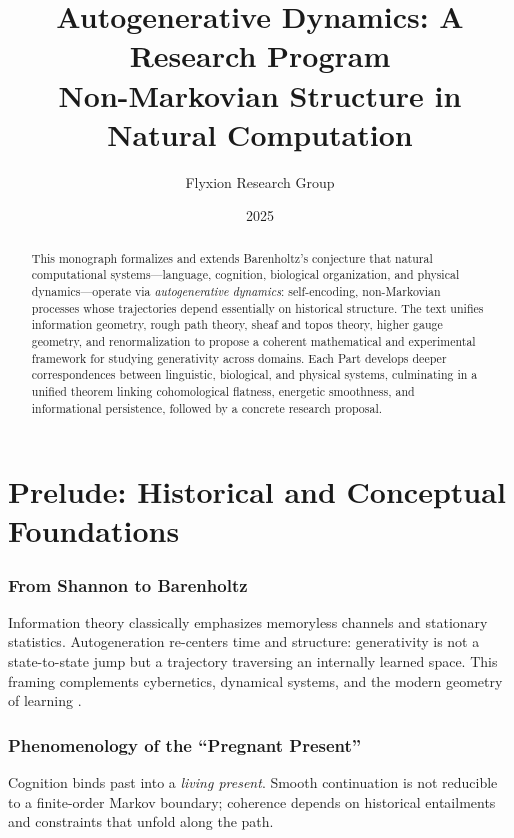 \documentclass[12pt,a4paper]{article}
\title{\Huge\textbf{Autogenerative Dynamics: A Research Program}\\[0.4em]
\large Non-Markovian Structure in Natural Computation}
\author{Flyxion Research Group}
\date{2025}
\theoremstyle{definition}
\begin{document}
\maketitle
\thispagestyle{empty}

\vspace{1em}
\begin{abstract}
This monograph formalizes and extends Barenholtz's conjecture that natural computational systems—language, cognition, biological organization, and physical dynamics—operate via \emph{autogenerative dynamics}: self-encoding, non-Markovian processes whose trajectories depend essentially on historical structure. The text unifies information geometry, rough path theory, sheaf and topos theory, higher gauge geometry, and renormalization to propose a coherent mathematical and experimental framework for studying generativity across domains. Each Part develops deeper correspondences between linguistic, biological, and physical systems, culminating in a unified theorem linking cohomological flatness, energetic smoothness, and informational persistence, followed by a concrete research proposal.
\end{abstract}

\newpage
\tableofcontents
\newpage

\part*{Prelude: Historical and Conceptual Foundations}

\section{From Shannon to Barenholtz}
Information theory classically emphasizes memoryless channels and stationary statistics. Autogeneration re-centers time and structure: generativity is not a state-to-state jump but a trajectory traversing an internally learned space. This framing complements cybernetics, dynamical systems, and the modern geometry of learning \parencite{amari2016info}.

\section{Phenomenology of the ``Pregnant Present''}
Cognition binds past into a \emph{living present}. Smooth continuation is not reducible to a finite-order Markov boundary; coherence depends on historical entailments and constraints that unfold along the path.
\end{document}
